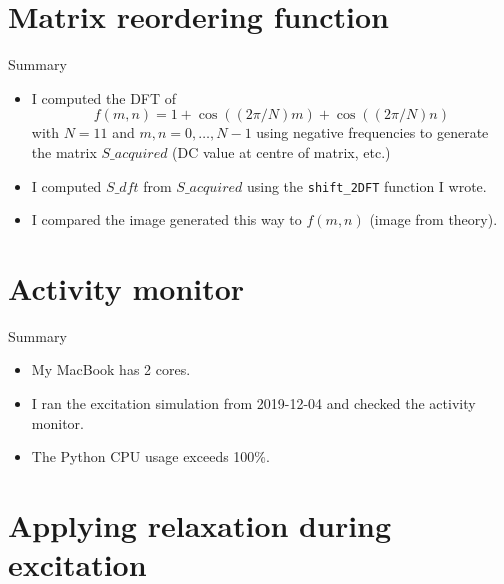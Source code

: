 \documentclass[dvipsnames]{beamer}
\begin{document}
\section{Matrix reordering function}

\begin{frame}{Summary}
\begin{itemize}
\item I computed the DFT of
\begin{equation*}
f(m,n) = 1 + \cos((2\pi/N)m) + \cos((2\pi/N)n)
\end{equation*}
with $N = 11$ and $m,n = 0,\ldots,N-1$ using negative frequencies to generate the matrix $S\_{acquired}$ (DC value at centre of matrix, etc.)
\item I computed $S\_{dft}$ from $S\_{acquired}$ using the \texttt{shift\_2DFT} function I wrote.
\item I compared the image generated this way to $f(m,n)$ (image from theory).
\end{itemize}
\end{frame}

\begin{frame}{Test results}
\begin{center}
\texttt{[image: \{shift\_2DFT\_test]}}
\end{center}
\end{frame}

\section{Activity monitor}

\begin{frame}{Summary}
\begin{itemize}
\item My MacBook has 2 cores.
\item I ran the excitation simulation from 2019-12-04 and checked the activity monitor.
\item The Python CPU usage exceeds 100\%.
\end{itemize}
\end{frame}

\begin{frame}{Screenshot}
\begin{center}
\texttt{[image: \{activity\_monitor]}}
\end{center}
\end{frame}

\section{Applying relaxation during excitation}
\end{document}
